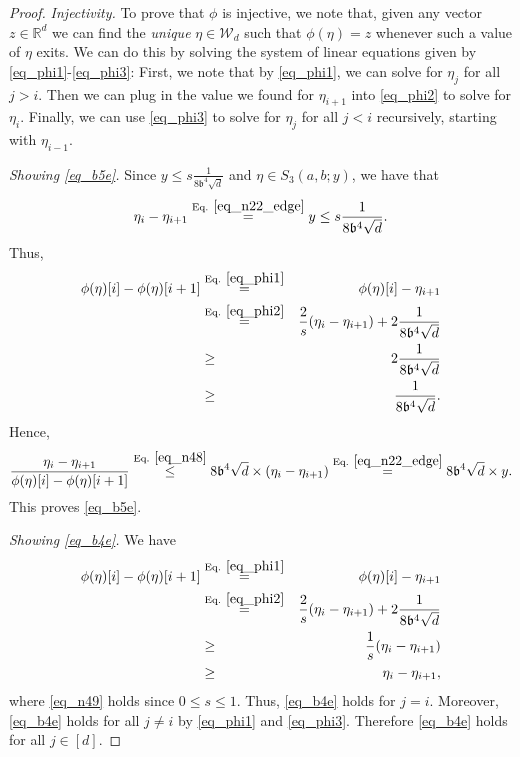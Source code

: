 \documentclass[11pt,letterpaper]{article}
\begin{document}
\begin{proof}

\medskip
\noindent
{\em Injectivity.}
%
To prove that $\phi$ is injective, we note that, given any vector $z \in \mathbb{R}^d$ we can find the {\em unique} $\eta \in \mathcal{W}_d$ such that $\phi(\eta) = z$ whenever such a value of $\eta$ exits.
%
We can do this by solving the system of linear equations given by  \eqref{eq_phi1}-\eqref{eq_phi3}:
%
First, we note that by \eqref{eq_phi1}, we can solve for $\eta_j$ for all $j >i$.
%
Then we can plug in the value we found for  $\eta_{i+1}$ into \eqref{eq_phi2} to solve for $\eta_i$.
%
Finally, we can use \eqref{eq_phi3} to solve for $\eta_j$ for all $j<i$ recursively, starting with $\eta_{i-1}$.





\medskip
\noindent
{\em Showing \eqref{eq_b5e}.}
%
Since  $y \leq s\frac{1}{8\mathfrak{b}^4\sqrt{d} }$ and $\eta \in  S_3(a,b;y)$,
we have that 
%
\begin{equation}
    \eta_i-\eta_{i+1} \stackrel{\textrm{Eq. } \eqref{eq_n22_edge}}{=} y \leq s\frac{1}{8\mathfrak{b}^4\sqrt{d} }.
    \end{equation}
%
%
Thus,
%
  \begin{eqnarray}\label{eq_n48}
  \phi(\eta)[i] - \phi(\eta)[i+1] &\stackrel{\textrm{Eq. } \eqref{eq_phi1}}{=}& \phi(\eta)[i] - \eta_{i+1} \nonumber\\
  &\stackrel{\textrm{Eq. } \eqref{eq_phi2}}{=}& \frac{2}{s}(\eta_{i}- \eta_{i+1})+ 2\frac{1}{8\mathfrak{b}^4\sqrt{d}} \nonumber\\
  &\geq & 2\frac{1}{8\mathfrak{b}^4\sqrt{d}} \nonumber\\
  &\geq & \frac{1}{8\mathfrak{b}^4\sqrt{d}}.
  \end{eqnarray}
%
Hence, 
%
\begin{equation*}
\frac{\eta_{i} - \eta_{i+1}}{\phi(\eta)[i] -  \phi(\eta)[i+1]}  \stackrel{\textrm{Eq. } \eqref{eq_n48}}{\leq}  8\mathfrak{b}^4 \sqrt{d}  \times (\eta_{i} - \eta_{i+1}) \stackrel{\textrm{Eq. } \eqref{eq_n22_edge}}{=}   8\mathfrak{b}^4 \sqrt{d}  \times y.
\end{equation*}
%
This proves \eqref{eq_b5e}.

\medskip
\noindent
{\em Showing \eqref{eq_b4e}.}
%
We have
%
  \begin{eqnarray}
  \phi(\eta)[i] - \phi(\eta)[i+1]  &\stackrel{\textrm{Eq. } \eqref{eq_phi1}}{=} & \phi(\eta)[i] - \eta_{i+1} \nonumber\\
  &\stackrel{\textrm{Eq. } \eqref{eq_phi2}}{=} & \frac{2}{s}(\eta_{i}- \eta_{i+1})+ 2\frac{1}{8\mathfrak{b}^4\sqrt{d}}  \nonumber\\
    &\geq & \frac{1}{s}(\eta_{i}- \eta_{i+1}) \nonumber\\
        &\geq & \eta_{i}- \eta_{i+1}, \label{eq_n49}
  \end{eqnarray}
  where \eqref{eq_n49} holds since $0 \leq s\leq 1$.
  Thus, \eqref{eq_b4e} holds for $j=i$.
  Moreover, \eqref{eq_b4e} holds for all  $j \neq i$ by \eqref{eq_phi1} and \eqref{eq_phi3}.
%  
  Therefore \eqref{eq_b4e} holds for all $j \in [d]$.
\end{proof}
\end{document}
